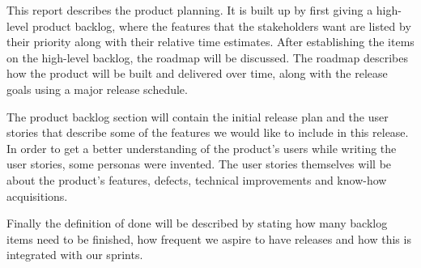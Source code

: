 This report describes the product planning. It is built up by first giving a high-level product backlog, where the features that the stakeholders want are listed by their priority along with their relative time estimates. After establishing the items on the high-level backlog, the roadmap will be discussed. The roadmap describes how the product will be built and delivered over time, along with the release goals using a major release schedule.

The product backlog section will contain the initial release plan and the user stories that describe some of the features we would like to include in this release. In order to get a better understanding of the product's users while writing the user stories, some personas were invented. The user stories themselves will be about the product's features, defects, technical improvements and know-how acquisitions.

Finally the definition of done will be described by stating how many backlog items need to be finished, how frequent we aspire to have releases and how this is integrated with our sprints.


